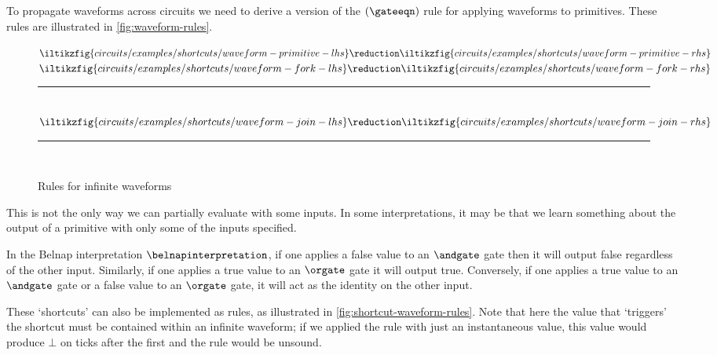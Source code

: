 \documentclass{lmcs}
\begin{document}
To propagate waveforms across circuits we need to derive a version of the
\((\gateeqn)\) rule for applying waveforms to primitives.
These rules are illustrated in \autoref{fig:waveform-rules}.

\begin{figure}
    \centering
    \(
    \iltikzfig{circuits/examples/shortcuts/waveform-primitive-lhs}
    \reduction
    \iltikzfig{circuits/examples/shortcuts/waveform-primitive-rhs}
    \)
    \quad
    \(
    \iltikzfig{circuits/examples/shortcuts/waveform-fork-lhs}
    \reduction
    \iltikzfig{circuits/examples/shortcuts/waveform-fork-rhs}
    \)
    \\[0.25em]
    \rule{\textwidth}{0.1mm}
    \\[0.5em]
    \(
    \iltikzfig{circuits/examples/shortcuts/waveform-join-lhs}
    \reduction
    \iltikzfig{circuits/examples/shortcuts/waveform-join-rhs}
    \)
    \\[0.25em]
    \rule{\textwidth}{0.1mm}
    \\[0.5em]
    \caption{Rules for infinite waveforms}
    \label{fig:waveform-rules}
\end{figure}

This is not the only way we can partially evaluate with some inputs.
In some interpretations, it may be that we learn something about the output of
a primitive with only some of the inputs specified.

\begin{exa}
    In the Belnap interpretation \(\belnapinterpretation\), if one applies a
    false value to an \(\andgate\) gate then it will output false regardless of
    the other input.
    Similarly, if one applies a true value to an \(\orgate\) gate it will output
    true.
    Conversely, if one applies a true value to an \(\andgate\) gate or a false
    value to an \(\orgate\) gate, it will act as the identity on the other
    input.
\end{exa}

These `shortcuts' can also be implemented as rules, as illustrated in
\autoref{fig:shortcut-waveform-rules}.
Note that here the value that `triggers' the shortcut must be contained within
an infinite waveform; if we applied the rule with just an instantaneous value,
this value would produce \(\bot\) on ticks after the first and the rule would
be unsound.
\end{document}

